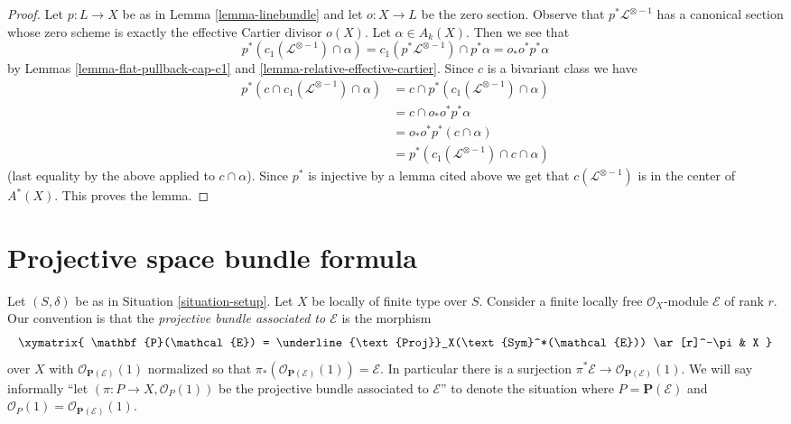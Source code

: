 \begin{proof}
Let $p : L \to X$ be as in Lemma \ref{lemma-linebundle} and let $o : X \to L$
be the zero section. Observe that $p^*\mathcal{L}^{\otimes -1}$ has a
canonical section whose zero scheme is exactly the effective Cartier divisor
$o(X)$. Let $\alpha \in A_k(X)$. Then we see that
$$
p^*(c_1(\mathcal{L}^{\otimes -1}) \cap \alpha) =
c_1(p^*\mathcal{L}^{\otimes -1}) \cap p^*\alpha =
o_* o^* p^*\alpha
$$
by Lemmas \ref{lemma-flat-pullback-cap-c1} and
\ref{lemma-relative-effective-cartier}.
Since $c$ is a bivariant class we have
\begin{align*}
p^*(c \cap c_1(\mathcal{L}^{\otimes -1}) \cap \alpha)
& =
c \cap p^*(c_1(\mathcal{L}^{\otimes -1}) \cap \alpha) \\
& =
c \cap o_* o^* p^*\alpha \\
& =
o_* o^* p^*(c \cap \alpha) \\
& =
p^*(c_1(\mathcal{L}^{\otimes -1}) \cap c \cap \alpha)
\end{align*}
(last equality by the above applied to $c \cap \alpha$).
Since $p^*$ is injective by a lemma cited above we get that
$c(\mathcal{L}^{\otimes -1})$
is in the center of $A^*(X)$. This proves the lemma.
\end{proof}






\section{Projective space bundle formula}
\label{section-projective-space-bundle-formula}

\noindent
Let $(S, \delta)$ be as in Situation \ref{situation-setup}.
Let $X$ be locally of finite type over $S$.
Consider a finite locally free $\mathcal{O}_X$-module
$\mathcal{E}$ of rank $r$.
Our convention is that the {\it projective bundle associated to
$\mathcal{E}$} is the morphism
$$
\xymatrix{
\mathbf{P}(\mathcal{E}) =
\underline{\text{Proj}}_X(\text{Sym}^*(\mathcal{E}))
\ar[r]^-\pi
& X
}
$$
over $X$ with
$\mathcal{O}_{\mathbf{P}(\mathcal{E})}(1)$ normalized so that
$\pi_*(\mathcal{O}_{\mathbf{P}(\mathcal{E})}(1)) = \mathcal{E}$.
In particular there is a surjection
$\pi^*\mathcal{E} \to \mathcal{O}_{\mathbf{P}(\mathcal{E})}(1)$.
We will say informally ``let $(\pi : P \to X, \mathcal{O}_P(1))$
be the projective bundle associated to $\mathcal{E}$'' to denote
the situation where $P = \mathbf{P}(\mathcal{E})$ and
$\mathcal{O}_P(1) = \mathcal{O}_{\mathbf{P}(\mathcal{E})}(1)$.

